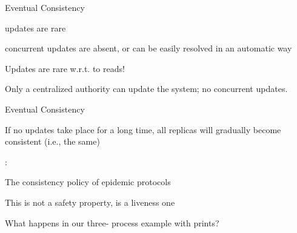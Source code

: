 \begin{frame}{Eventual Consistency}
	

\BI
\item updates are rare
\item concurrent updates are absent, or can be easily resolved in an automatic way
\EI

\bigskip
{}

\BI
\item Updates are rare w.r.t. to reads!
\item Only a centralized authority can update the system; no concurrent updates.
\EI

\bigskip
{}

\end{frame}

\begin{frame}{Eventual Consistency}

\begin{definition}
If no updates take place for a long time, all replicas will gradually become consistent (i.e., the same)
\end{definition}

\bigskip
{}:

\BIL
\item The consistency policy of epidemic protocols
\item This is not a safety property, is a liveness one
\item What happens in our three- process example with prints?
\EIL

\end{frame}

